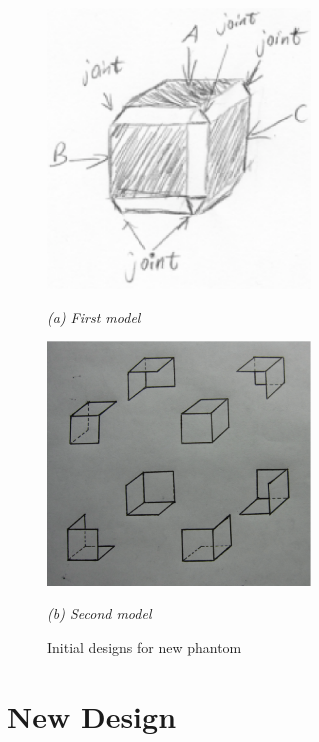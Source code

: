 \begin{figure}[htb]
  \begin{minipage}[b]{2.75in}
    \centering
    \centerline{\mbox{\includegraphics[width=2.75in]{phantom/images/brain_storm/model1.eps}}}
    \centerline{\emph{(a) First model}}
  \end{minipage}\medskip
  \begin{minipage}[b]{2.75in}
    \centering
    \centerline{\mbox{\includegraphics[width=2.75in]{phantom/images/brain_storm/model2.eps}}}
    \centerline{\emph{(b) Second model}}
  \end{minipage}
  \caption{Initial designs for new phantom}
  \label{fig:initial_phantom_design}
\end{figure}

\section{New Design}

